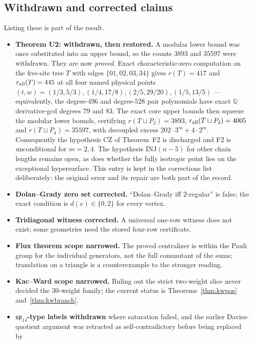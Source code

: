 \documentclass[11pt]{article}
\theoremstyle{definition}
\newcommand{\Qb}{\mathbb{Q}}
\begin{document}
\subsection{Withdrawn and corrected claims}
Listing these is part of the result.
\begin{itemize}[leftmargin=*,itemsep=2pt]
\item \textbf{Theorem U2: withdrawn, then restored.} A modular lower bound was once substituted into
      an upper bound, so the counts $3893$ and $35597$ were withdrawn. They are now \emph{proved}.
      Exact characteristic-zero computation on the five-site tree $T$ with edges
      $\{01,02,03,34\}$ gives $r(T)=417$ and $r_{\rm all}(T)=445$ at all four named physical points
      $(t,w)=(1/3,5/3),(1/4,17/8),(2/5,29/20),(1/5,13/5)$ --- equivalently, the degree-$496$ and
      degree-$528$ pair polynomials have exact $\Qb$ derivative-gcd degrees $79$ and $83$. The exact
      core upper bounds then squeeze the modular lower bounds, certifying
      $r(T\sqcup P_2)=3893$, $r_{\rm all}(T\sqcup P_2)=4005$ and $r(T\sqcup P_4)=35597$, with
      decoupled excess $202\cdot3^m+4\cdot2^m$. Consequently the hypothesis CZ of Theorem~F2 is
      discharged and F2 is unconditional for $m=2,4$. The hypothesis $\mathrm{INJ}(n-5)$ for other
      chain lengths remains open, as does whether the fully isotropic point lies on the exceptional
      hypersurface. This entry is kept in the corrections list deliberately: the original error and
      its repair are both part of the record.
\item \textbf{Dolan--Grady zero set corrected.} ``Dolan--Grady iff $2$-regular'' is false; the exact
      condition is $d(v)\in\{0,2\}$ for every vertex.
\item \textbf{Tridiagonal witness corrected.} A universal one-row witness does not exist; some
      geometries need the stored four-row certificate.
\item \textbf{Flux theorem scope narrowed.} The proved centralizer is within the Pauli group for the
      individual generators, not the full commutant of the sums; translation on a triangle is a
      counterexample to the stronger reading.
\item \textbf{Kac--Ward scope narrowed.} Ruling out the strict two-weight slice never decided the
      $30$-weight family; the current status is Theorems~\ref{thm:kwpos} and~\ref{thm:kwbranch}.
\item \textbf{$\mathfrak{sp}_{14}$-type labels withdrawn} where saturation failed, and the earlier
      Davies-quotient argument was retracted as self-contradictory before being replaced by

\end{itemize}
\end{document}

